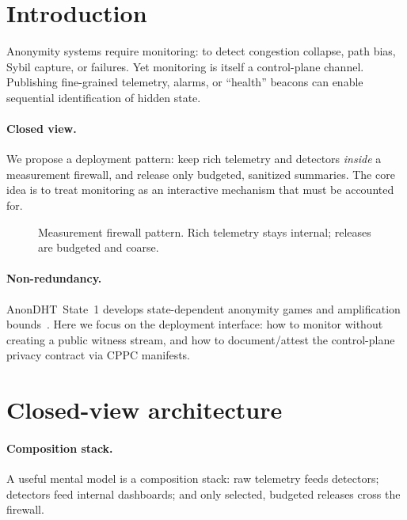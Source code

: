 \documentclass[11pt]{article}
\begin{document}
\section{Introduction}
Anonymity systems require monitoring: to detect congestion collapse, path bias, Sybil capture, or failures.
Yet monitoring is itself a control-plane channel.
Publishing fine-grained telemetry, alarms, or ``health'' beacons can enable sequential identification of hidden state.

\paragraph{Closed view.}
We propose a deployment pattern: keep rich telemetry and detectors \emph{inside} a measurement firewall, and release only budgeted, sanitized summaries.
The core idea is to treat monitoring as an interactive mechanism that must be accounted for.

\begin{figure}[t]
  \centering
  \caption{Measurement firewall pattern. Rich telemetry stays internal; releases are budgeted and coarse.}
  \label{fig:fw}
\end{figure}

\paragraph{Non-redundancy.}
AnonDHT~State~1 develops state-dependent anonymity games and amplification bounds~\cite{series:state1}.
Here we focus on the deployment interface: how to monitor without creating a public witness stream, and how to document/attest the control-plane privacy contract via CPPC manifests.


\section{Closed-view architecture}
\label{sec:closed}

\paragraph{Composition stack.}
A useful mental model is a composition stack: raw telemetry feeds detectors; detectors feed internal dashboards; and only selected, budgeted releases cross the firewall.
\end{document}
